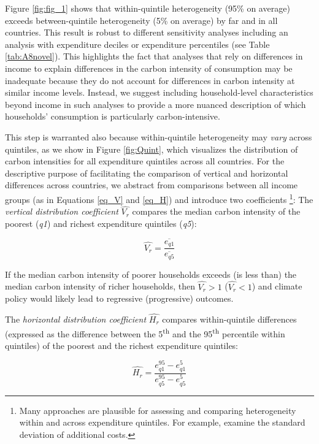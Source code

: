 \documentclass[12pt, a4paper]{article}
\begin{document}
Figure \ref{fig:fig_1} shows that within-quintile heterogeneity (95\% on average) exceeds between-quintile heterogeneity (5\% on average) by far and in all countries. This result is robust to different sensitivity analyses including an analysis with expenditure deciles or expenditure percentiles (see Table \ref{tab:A8novel}). This highlights the fact that analyses that rely on differences in income to explain differences in the carbon intensity of consumption may be inadequate because they do not account for differences in carbon intensity at similar income levels. Instead, we suggest including household-level characteristics beyond income in such analyses to provide a more nuanced description of which households' consumption is particularly carbon-intensive.

This step is warranted also because within-quintile heterogeneity may \textit{vary} across quintiles, as we show in Figure \ref{fig:Quint}, which visualizes the distribution of carbon intensities for all expenditure quintiles across all countries. For the descriptive purpose of facilitating the comparison of vertical and horizontal differences across countries, we abstract from comparisons between all income groups (as in Equations \ref{eq_V} and \ref{eq_H}) and introduce two coefficients \autocite{Missbach.2024}\footnote{Many approaches are plausible for assessing and comparing heterogeneity within and across expenditure quintiles. For example, \textcite{Cronin.2019} examine the standard deviation of additional costs.}: The \textit{vertical distribution coefficient} $\widehat{V_{r}}$ compares the median carbon intensity of the poorest (\textit{q1}) and richest expenditure quintiles (\textit{q5}):

\begin{equation}
    \widehat{V_{r}} = \frac{\overline{e_{q1}}}{\overline{e_{q5}}}
\end{equation}

If the median carbon intensity of poorer households exceeds (is less than) the median carbon intensity of richer households, then $\widehat{V_{r}}>1$ ($\widehat{V_{r}}<1$) and climate policy would likely lead to regressive (progressive) outcomes.

The \textit{horizontal distribution coefficient} $\widehat{H_{r}}$ compares within-quintile differences (expressed as the difference between the 5\textsuperscript{th} and the 95\textsuperscript{th} percentile within quintiles) of the poorest and the richest expenditure quintiles:

\begin{equation}
    \widehat{H_{r}} = \frac{e_{q1}^{95} - e_{q1}^{5}}{e_{q5}^{95} - e_{q5}^{5}}
\end{equation}
\end{document}
